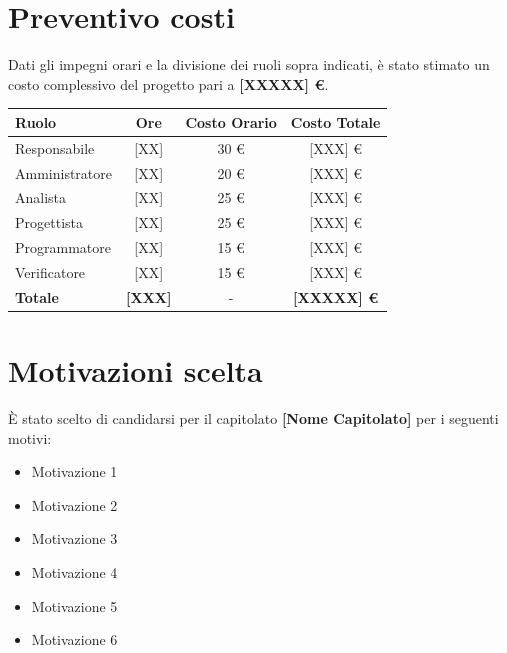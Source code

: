 \documentclass[a4paper,12pt]{article}
\begin{document}
\newpage

\section{Preventivo costi}

Dati gli impegni orari e la divisione dei ruoli sopra indicati, è stato stimato un costo complessivo del progetto pari a \textbf{[XXXXX] \euro}.

\vspace{0.5cm}

\begin{center}
\begin{tcolorbox}[colback=lightgray,colframe=primaryblue,width=0.9\textwidth,arc=2mm,boxrule=0.5pt]
\begin{center}
\begin{tabular}{lccc}
\toprule
\textbf{Ruolo} & \textbf{Ore} & \textbf{Costo Orario} & \textbf{Costo Totale} \\
\midrule
Responsabile & [XX] & 30 \euro & [XXX] \euro \\
Amministratore & [XX] & 20 \euro & [XXX] \euro \\
Analista & [XX] & 25 \euro & [XXX] \euro \\
Progettista & [XX] & 25 \euro & [XXX] \euro \\
Programmatore & [XX] & 15 \euro & [XXX] \euro \\
Verificatore & [XX] & 15 \euro & [XXX] \euro \\
\midrule
\textbf{Totale} & \textbf{[XXX]} & - & \textbf{[XXXXX] \euro} \\
\bottomrule
\end{tabular}
\end{center}
\end{tcolorbox}
\end{center}

\newpage

\section{Motivazioni scelta}

È stato scelto di candidarsi per il capitolato \textbf{[Nome Capitolato]} per i seguenti motivi:

\begin{itemize}
    \item Motivazione 1
    \item Motivazione 2
    \item Motivazione 3
    \item Motivazione 4
    \item Motivazione 5
    \item Motivazione 6
\end{itemize}
\end{document}

